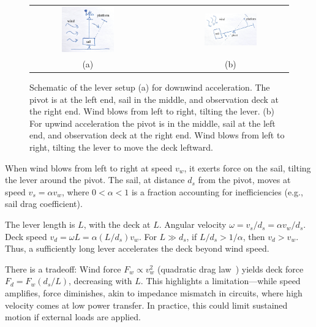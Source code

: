 \documentclass[reprint,aps,pra,superscriptaddress,longbibliography]{revtex4-2}
\begin{document}
\begin{figure}[htbp]
\centering
\begin{tabular}{ccc}
\includegraphics[width=0.48\textwidth]{2025-wind-lww.jpg}
&$\qquad$&
\includegraphics[width=0.48\textwidth]{2025-wind-law.jpg}
\\
(a)&&(b)
\end{tabular}
\caption{Schematic of the lever setup (a) for downwind acceleration. The pivot is at the left end, sail in the middle, and observation deck at the right end. Wind blows from left to right, tilting the lever. (b) For upwind acceleration the pivot is in the middle, sail at the left end, and observation deck at the right end. Wind blows from left to right, tilting the lever to move the deck leftward.}
\label{fig:lever-downupwind}
\end{figure}

When wind blows from left to right at speed $v_w$, it exerts force on the sail, tilting the lever around the pivot. The sail, at distance $d_s$ from the pivot, moves at speed $v_s = \alpha v_w$, where $0< \alpha < 1$ is a fraction accounting for inefficiencies (e.g., sail drag coefficient).

The lever length is $L$, with the deck at $L$. Angular velocity $\omega = v_s / d_s = \alpha v_w / d_s$. Deck speed $v_d = \omega L = \alpha (L / d_s) v_w$. For $L \gg d_s$, if $L / d_s > 1/\alpha$, then $v_d > v_w$. Thus, a sufficiently long lever accelerates the deck beyond wind speed.

There is a tradeoff: Wind force $F_w \propto v_w^2$ (quadratic drag law~\cite{Anderson2024}) yields deck force $F_d = F_w (d_s / L)$, decreasing with $L$. This highlights a limitation---while speed amplifies, force diminishes, akin to impedance mismatch in circuits, where high velocity comes at low power transfer. In practice, this could limit sustained motion if external loads are applied.
\end{document}
